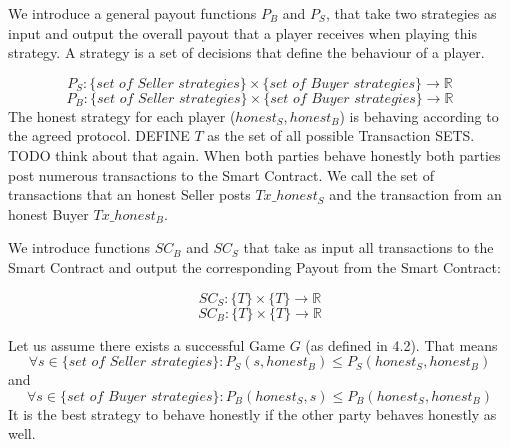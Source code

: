 \documentclass{cacthesis}
\begin{document}

We introduce a general payout functions $P_B$ and $P_S$, that take two strategies as input and output the overall payout that a player receives when playing this strategy.\newline
A strategy is a set of decisions that define the behaviour of a player. %


\[P_S : \{ \textit{set of Seller strategies}\} \times \{ \textit{set of Buyer strategies}\} \to \mathbb{R}\]
\[P_B : \{ \textit{set of Seller strategies}\} \times \{ \textit{set of Buyer strategies}\} \to \mathbb{R}\]
The honest strategy for each player ($honest_S, honest_B$) is behaving according to the agreed protocol.
DEFINE $T$ as the set of all possible Transaction SETS. TODO think about that again.\newline
When both parties behave honestly both parties post numerous transactions to the Smart Contract. We call the set of transactions that an honest Seller posts $Tx\_honest_S$ and the transaction from an honest Buyer $Tx\_honest_B$.

We introduce functions $SC_B$ and $SC_S$ that take as input all transactions to the Smart Contract and output the corresponding Payout from the Smart Contract:

\[ SC_S : \{T\} \times \{T\} \to \mathbb{R} \]
\[ SC_B : \{T\} \times \{T\} \to \mathbb{R} \]

Let us assume there exists a successful Game $G$ (as defined in 4.2). That means
\begin{equation}
    \forall s \in \{\textit{set of Seller strategies}\}: P_S(s, honest_B) \leq P_S(honest_S,honest_B)
\end{equation}
and
\begin{equation}
    \forall s \in \{\textit{set of Buyer strategies}\}: P_B(honest_S, s) \leq P_B(honest_S,honest_B)
\end{equation}
It is the best strategy to behave honestly if the other party behaves honestly as well.\newline
\end{document}
